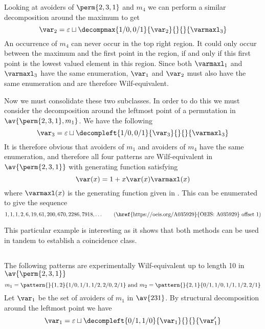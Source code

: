 Looking at avoiders of \(\perm{2,3,1}\) and \(m_4\) we
can perform a similar decomposition around the maximum to get
\begin{equation*}
    \scriptvar_2 = \varepsilon \sqcup
    \decompmax{1/0,0/1}{\scriptvar_2}{}{}{\mathcal{\varmaxl}_3}
\end{equation*}
An occurrence of \(m_4\) can never occur in the
top right region. It could only occur between the maximum and the first point
in the region, if and only if this first point is the lowest valued element in
this region.
Since both \(\mathcal{\varmaxl}_1\) and \(\mathcal{\varmaxl}_3\) have the same
enumeration, \(\scriptvar_1\) and \(\scriptvar_2\) must also have
the same enumeration and are therefore Wilf-equivalent.

Now we must consolidate these two subclasses. In order to do this we must
consider the decomposition around the leftmost point of a permutation in
\(\av{\perm{2,3,1},m_1}\). We have the following
\begin{equation*}
    \scriptvar_3 = \varepsilon \sqcup
    \decompleft{1/0,0/1}{\scriptvar_3}{}{}{\mathcal{\varmaxl}_3}
\end{equation*}
It is therefore obvious that avoiders of \(m_1\) and avoiders of \(m_4\)
have the same enumeration, and therefore all four patterns are Wilf-equivalent
in \(\av{\perm{2,3,1}}\) with generating function satisfying
\begin{equation*}
    \var(x) = 1 + x\var(x)\varmaxl(x)
\end{equation*}
where \(\varmaxl(x)\) is the generating function given in .
This can be enumerated to give the sequence
\begin{equation*}
    1, 1, 1, 2, 6, 19, 61, 200, 670, 2286, 7918,\dotsc \tag{\href{https://oeis.org/A035929}{OEIS: A035929} offset 1}
\end{equation*}

This particular example is interesting as it shows that both methods can be used in tandem to establish a coincidence class.

\subsection{}
\nextvar
The following patterns are experimentally Wilf-equivalent up to length 10 in
\(\av{\perm{2,3,1}}\)
\begin{equation*}
    m_1 = \pattern{}{1,2}{1/0,1/1,1/2,2/0,2/1} \text{ and }
    m_2 = \pattern{}{2,1}{0/1,1/0,1/1,1/2,2/1}
\end{equation*}
Let \(\scriptvar_1\) be the set of avoiders of \(m_1\) in \(\av{231}\). By structural decomposition
around the leftmost point we have
\begin{equation*}
    \scriptvar_1 = \varepsilon \sqcup
    \decompleft{0/1,1/0}{\scriptvar_1}{}{}{\scriptvar^\prime_1}
\end{equation*}

